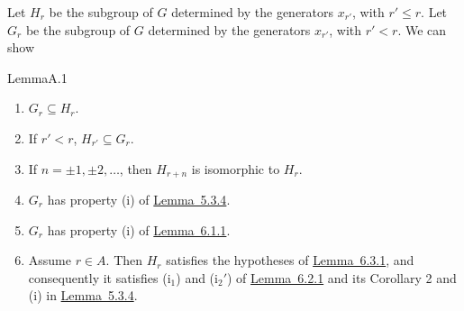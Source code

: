 \documentclass[b5paper,twoside]{article}
\newcommand{\lemref}[2]{\hyperref[#1]{\mbox{Lemma~#2}}}
\theoremstyle{mvnplain}
\def\mathfrak#1{#1}%
\begin{document}
Let $\mathfrak H_r$ be the subgroup of $\mathfrak G$ determined by
the generators $x_{r'}$, with $r'\leq r$. Let $\mathfrak G_r$ be the subgroup
of $\mathfrak G$ determined by the generators $x_{r'}$, with $r'<r$. We can
show
\begin{namedstatement}{Lemma}{A.1}\label{lem:A.1}
\begin{enumerate}[label=(\roman*),leftmargin=3em]
\item $\mathfrak G_r\subseteq\mathfrak H_r$.
\item If $r'<r$, $\mathfrak H_{r'}\subseteq\mathfrak G_r$.
\item If $n=\pm1,\pm2,\ldots$, then
$\mathfrak H_{r+n}$ is isomorphic to $\mathfrak H_r$.
\item $\mathfrak G_r$ has property (i) of \lemref{lem:5.3.4}{5.3.4}.
\item $\mathfrak G_r$ has property (i) of \lemref{lem:6.1.1}{6.1.1}.
\item Assume $r\in A$. Then $\mathfrak H_r$ satisfies the
hypotheses of \lemref{lem:6.3.1}{6.3.1}, and consequently it satisfies
(i$_1$) and (i$_2'$) of \lemref{lem:6.2.1}{6.2.1} and its Corollary 2 and (i)
in \lemref{lem:5.3.4}{5.3.4}.
\end{enumerate}
\end{namedstatement}
\end{document}
